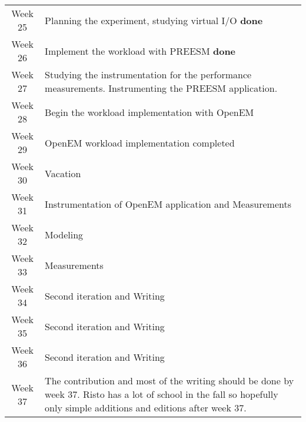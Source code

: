 \begin{samepage}
    \begin{table}[h]
        \centering
            \begin{tabular}{@{}c|p{10cm}@{}}
                Week 25 & Planning the experiment, studying virtual I/O \textbf{done}\\
                Week 26 & Implement the workload with PREESM \textbf{done}\\
                Week 27 & Studying the instrumentation for the performance measurements. Instrumenting the PREESM application. \\
                Week 28 & Begin the workload implementation with OpenEM \\
                Week 29 & OpenEM workload implementation completed \\
                Week 30 & Vacation \\
                Week 31 & Instrumentation of OpenEM application and Measurements \\
                Week 32 & Modeling \\
                Week 33 & Measurements \\
                Week 34 & Second iteration and Writing \\
                Week 35 & Second iteration and Writing \\
                Week 36 & Second iteration and Writing \\
                Week 37 & The contribution and most of the writing should be done by week 37. Risto has a lot of school in the fall so hopefully only simple additions and editions after week 37. \\
        \end{tabular}
    \end{table}
\end{samepage}
